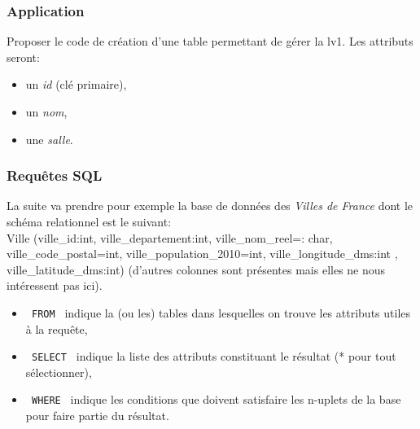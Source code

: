 \begin{frame}[fragile]
\frametitle{Application}

Proposer le code de création d'une table permettant de gérer la lv1. Les attributs seront:
\begin{itemize}
 \item un \textit{id} (clé primaire),
 \item un  \textit{nom},
 \item une \textit{salle}.
\end{itemize}

\begin{GrayBox}[0.85\textwidth]
\begin{semiverbatim}\small
{}
\end{semiverbatim}
\end{GrayBox}
\end{frame}

\begin{frame}[fragile]
\frametitle{Requêtes SQL}

La suite va prendre pour exemple la base de données des \textit{Villes de France} dont le schéma relationnel est le suivant:\\
Ville (ville\_id:int, ville\_departement:int, ville\_nom\_reel=: char, ville\_code\_postal=int, ville\_population\_2010=int, ville\_longitude\_dms:int , ville\_latitude\_dms:int) (d'autres colonnes sont présentes mais elles ne nous intéressent pas ici).

\begin{itemize}
 \item \verb? FROM ? indique la (ou les) tables dans lesquelles on trouve les attributs utiles à la requête,
 \item \verb? SELECT ? indique la liste des attributs constituant le résultat (* pour tout sélectionner),
 \item \verb? WHERE ? indique les conditions que doivent satisfaire les n-uplets de la base pour faire partie du résultat.
\end{itemize}

\end{frame}

